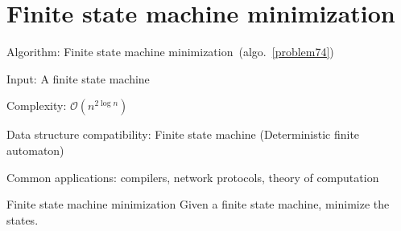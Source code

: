 \documentclass{article}
\begin{document}
\fi

%
%

\def\pbname{Finite state machine minimization} %

\section{\pbname} 

\begin{overview}
\item [Algorithm:] Finite state machine minimization~(algo.~\ref{problem74}) 
\item [Input:] A finite state machine
\item [Complexity:] $\mathcal{O}(n^{2\log n})$
\item [Data structure compatibility:] Finite state machine (Deterministic finite automaton)
\item [Common applications:] compilers, network protocols, theory of computation
\end{overview}



\begin{problem}{\pbname}
	Given a finite state machine, minimize the states.
\end{problem}
\end{document}
